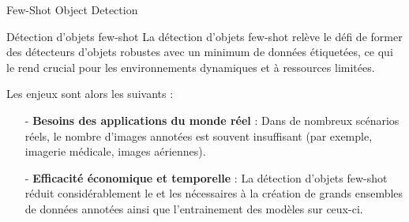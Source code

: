 \begin{subsectionframemod}{Few-Shot Object Detection}

    \vspace{-10mm}
    \begin{alertblock}{Détection d'objets few-shot}
        La détection d'objets few-shot relève le défi de former des détecteurs d'objets robustes avec un minimum de données étiquetées, ce qui le rend crucial pour les environnements dynamiques et à ressources limitées.
    \end{alertblock}

    Les enjeux sont alors les suivants :
    \begin{itemize}
        \item[-] \textbf{Besoins des applications du monde réel} : Dans de nombreux scénarios réels, le nombre d'images annotées est souvent insuffisant (par exemple, imagerie médicale, images aériennes).
        \item[-] \textbf{Efficacité économique et temporelle} : La détection d'objets few-shot réduit considérablement le  et les  nécessaires à la création de grands ensembles de données annotées ainsi que l'entrainement des modèles sur ceux-ci.
    \end{itemize}

\end{subsectionframemod}
